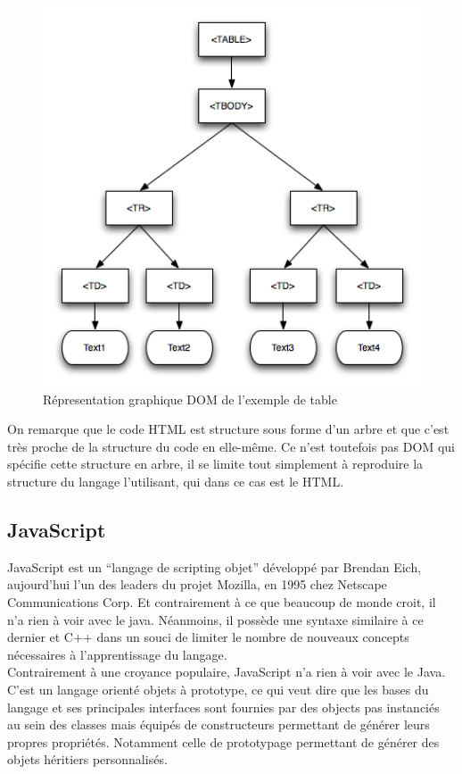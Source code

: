 \documentclass[10pt,a4paper,titlepage]{article}
\begin{document}
\begin{figure}[h]
	\begin{center}
			\includegraphics[width=12cm]{img/exempleDOM.png}
			\caption{Répresentation graphique DOM de l'exemple de table}
			\label{dom1}
	\end{center}
\end{figure}

On remarque que le code HTML est structure sous forme d'un arbre et que c'est très proche de la structure du code en elle-même. Ce n'est toutefois pas DOM qui spécifie cette structure en arbre, il se limite tout simplement à reproduire la structure du langage l'utilisant, qui dans ce cas est le HTML.

\subsection{JavaScript}
JavaScript est un “langage de scripting objet” développé par Brendan Eich, aujourd'hui l'un des leaders du projet Mozilla, en 1995 chez Netscape Communications Corp. Et contrairement à ce que beaucoup de monde croit, il n'a rien à voir avec le java. Néanmoins, il possède une syntaxe similaire à ce dernier et C++ dans un souci de limiter le nombre de nouveaux concepts nécessaires à l'apprentissage du langage.\\

Contrairement à une croyance populaire, JavaScript n'a rien à voir avec le Java. C'est un langage orienté objets à prototype, ce qui veut dire que les bases du langage et ses principales interfaces sont fournies par des objects pas instanciés au sein des classes mais équipés de constructeurs permettant de générer leurs propres propriétés. Notamment celle de prototypage permettant de générer des objets héritiers personnalisés.\\
\end{document}
